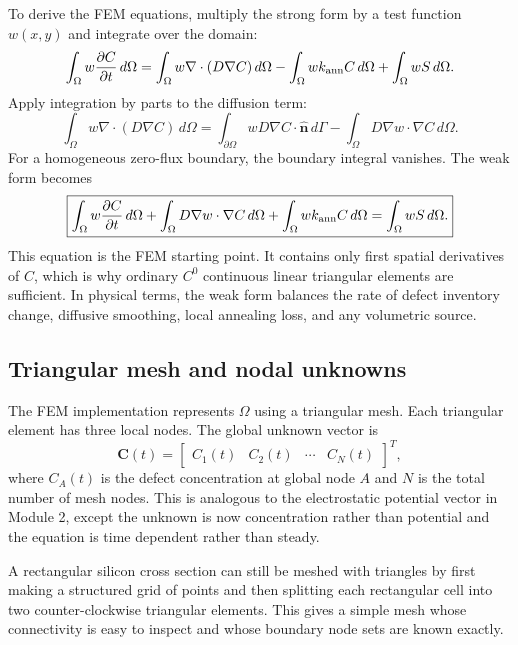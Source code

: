 \documentclass[11pt]{article}
\begin{document}
To derive the FEM equations, multiply the strong form by a test function $w(x,y)$ and integrate over the domain:
\begin{equation}
\int_{\Omega} w \pdv{C}{t}\,d\Omega
=
\int_{\Omega} w\nabla\cdot(D\nabla C)\,d\Omega
-
\int_{\Omega} wk_{\mathrm{ann}}C\,d\Omega
+
\int_{\Omega} wS\,d\Omega.
\end{equation}
Apply integration by parts to the diffusion term:
\begin{equation}
\int_{\Omega} w\nabla\cdot(D\nabla C)\,d\Omega
=
\int_{\partial\Omega} wD\nabla C\cdot\hat{\mathbf{n}}\,d\Gamma
-
\int_{\Omega} D\nabla w\cdot\nabla C\,d\Omega.
\end{equation}
For a homogeneous zero-flux boundary, the boundary integral vanishes. The weak form becomes
\begin{equation}
\boxed{
\int_{\Omega} w \pdv{C}{t}\,d\Omega
+
\int_{\Omega} D\nabla w\cdot\nabla C\,d\Omega
+
\int_{\Omega} wk_{\mathrm{ann}}C\,d\Omega
=
\int_{\Omega} wS\,d\Omega .
}
\end{equation}
This equation is the FEM starting point. It contains only first spatial derivatives of $C$, which is why ordinary $C^0$ continuous linear triangular elements are sufficient. In physical terms, the weak form balances the rate of defect inventory change, diffusive smoothing, local annealing loss, and any volumetric source.

\subsection{Triangular mesh and nodal unknowns}

The FEM implementation represents $\Omega$ using a triangular mesh. Each triangular element has three local nodes. The global unknown vector is
\begin{equation}
\bm{C}(t)=
\begin{bmatrix}
C_1(t) & C_2(t) & \cdots & C_N(t)
\end{bmatrix}^{T},
\end{equation}
where $C_A(t)$ is the defect concentration at global node $A$ and $N$ is the total number of mesh nodes. This is analogous to the electrostatic potential vector in Module 2, except the unknown is now concentration rather than potential and the equation is time dependent rather than steady.

A rectangular silicon cross section can still be meshed with triangles by first making a structured grid of points and then splitting each rectangular cell into two counter-clockwise triangular elements. This gives a simple mesh whose connectivity is easy to inspect and whose boundary node sets are known exactly.
\end{document}
